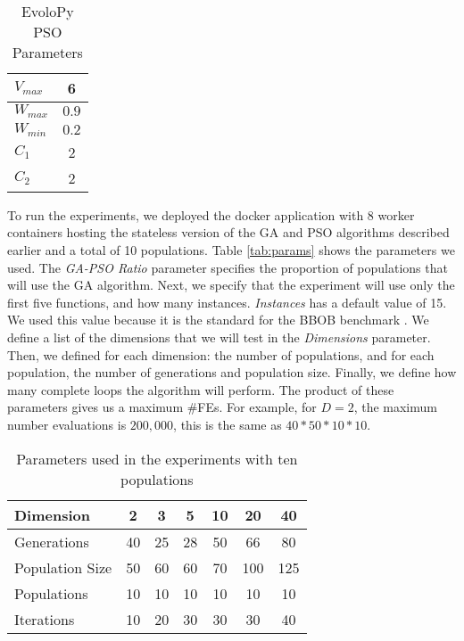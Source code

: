 \begin{table}
  \small
  \caption{ EvoloPy PSO Parameters }
  \label{tab:PSOparams} 
  \centering
  \small
  \begin{tabular}{|l|c|}
    \hline
    $V_{max}$ & 6 \\ \hline
    $W_{max}$ & $0.9$ \\ \hline
    $W_{min}$ & $0.2$ \\ \hline
    $C_1$ & 2 \\ \hline
    $C_2$ & 2 \\ \hline
  \end{tabular}
\end{table}

To run the experiments, we deployed the docker application with 8 worker
containers hosting the stateless version of the GA and PSO algorithms described
earlier and a total of 10 populations. Table \ref{tab:params} shows the
parameters we used. The {\em GA-PSO Ratio} parameter specifies the proportion of
populations that will use the GA algorithm. Next, we specify that the experiment
will use only the first five functions, and how many instances. {\em Instances}
has a default value of 15. We used this value because it is the standard for the
BBOB benchmark \cite{hansen2016coco}. We define a list of the dimensions that we
will test in the {\em Dimensions} parameter. Then, we defined for each
dimension: the number of populations, and for each population,  the number of
generations and population size. Finally, we define how many complete loops the
algorithm will perform. The product of these parameters gives us a maximum
\#FEs. For example, for $D = 2$, the maximum number evaluations is $200,000$,
this is the same as $40*50*10*10$.

\begin{table}
  \small
  \caption{Parameters used in the experiments with ten populations
  }
  \label{tab:params:10}
  \vspace{0.25cm}
  \centering
  \small
  \begin{tabular}{|l|c|c|c|c|c|c|}
    \hline
    Dimension        & 2  & 3  & 5  & 10 & 20  & 40  \\ \hline
    Generations      & 40 & 25 & 28 & 50 & 66  & 80  \\ \hline
    Population Size  & 50 & 60 & 60 & 70 & 100 & 125 \\ \hline
    Populations      & 10 & 10 & 10 & 10 & 10  & 10  \\ \hline
    Iterations       & 10 & 20 & 30 & 30 & 30  & 40  \\ \hline  
  \end{tabular}
\end{table}

